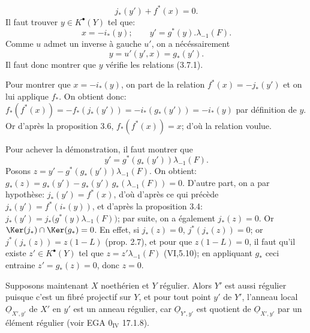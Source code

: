 
\[
j_*(y')+f^*(x)=0.
\]
Il
faut trouver \(y\in K^{\bullet}(Y)\) tel que:
\begin{equation}\tag{3.7.1}
x=-i_*(y);\qquad y'=g^*(y).\lambda_{-1}(F).
\end{equation}
Comme \(u\) admet un inverse à gauche \(u'\), on a nécéssairement
\[
y=u'(y',x)=g_*(y').
\]
Il faut donc montrer que \(y\) vérifie les relations (3.7.1).

Pour montrer que \(x=-i_*(y)\), on part de la relation \(f^*(x)=-j_*(y')\) et on lui applique \(f_*\). On obtient donc: \(f_*(f^*(x))=-f_*(j_*(y'))=-i_*(g_*(y'))=-i_*(y)\) par définition de \(y\). Or d'après la proposition 3.6, \(f_*(f^*(x))=x\); d'où la relation voulue.

Pour achever la démonstration, il faut montrer que
\[
y'=g^*(g_*(y'))\lambda_{-1}(F).
\]
Posons \(z=y'-g^*(g_*(y'))\lambda_{-1}(F)\). On obtient: \(g_*(z)=g_*(y')-g_*(y')\,g_*(\lambda_{-1}(F))=0\). D'autre part, on a par hypothèse: \(j_*(y')=f^*(x)\), d'où d'après ce qui précède \(j_*(y')=f^*(i_*(y))\), et d'après la proposition 3.4: \(j_*(y')=j_*\bigl(g^*(y)\lambda_{-1}(F)\bigr)\); par suite, on a également \(j_*(z)=0\). Or \(\Ker(j_*)\cap\Ker(g_*)=0\). En effet, si \(j_*(z)=0\), \(j^*(j_*(z))=0\); or \(j^*(j_*(z))=z(1-L)\) (prop. 2.7), et pour que \(z(1-L)=0\), il faut qu'il existe \(z'\in K^{\bullet}(Y)\) tel que \(z=z'\lambda_{-1}(F)\) (VI,5.10); en appliquant \(g_*\) ceci entraine \(z'=g_*(z)=0\), donc \(z=0\).

Supposons maintenant \(X\) noethérien et \(Y\) régulier. Alors \(Y'\) est aussi régulier puisque c'est un fibré projectif sur \(Y\), et pour tout point \(y'\) de \(Y'\), l'anneau local \(\underline{O}_{X',y'}\) de \(X'\) en \(y'\) est un anneau régulier, car \(\underline{O}_{Y',y'}\) est quotient de \(\underline{O}_{X',y'}\) par un élément régulier (voir EGA \(0_{\mathrm{IV}}\) 17.1.8).

